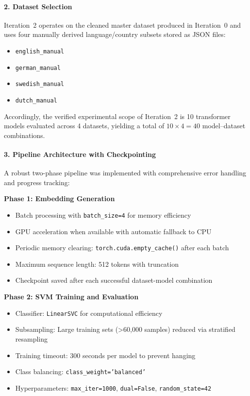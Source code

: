 \documentclass[11pt, titlepage, bibliography=totoc]{scrreprt}
\begin{document}
\paragraph{2. Dataset Selection}
Iteration~2 operates on the cleaned master dataset produced in Iteration~0 and uses four manually derived language/country subsets stored as JSON files:

\begin{itemize}
    \item \texttt{english\_manual}
    \item \texttt{german\_manual}
    \item \texttt{swedish\_manual}
    \item \texttt{dutch\_manual}
\end{itemize}

Accordingly, the verified experimental scope of Iteration~2 is 10 transformer models evaluated across 4 datasets, yielding a total of $10 \times 4 = 40$ model--dataset combinations.

\paragraph{3. Pipeline Architecture with Checkpointing}
A robust two-phase pipeline was implemented with comprehensive error handling and progress tracking:

\textbf{Phase 1: Embedding Generation}
\begin{itemize}
    \item Batch processing with \texttt{batch\_size=4} for memory efficiency
    \item GPU acceleration when available with automatic fallback to CPU
    \item Periodic memory clearing: \texttt{torch.cuda.empty\_cache()} after each batch
    \item Maximum sequence length: 512 tokens with truncation
    \item Checkpoint saved after each successful dataset-model combination
\end{itemize}

\textbf{Phase 2: SVM Training and Evaluation}
\begin{itemize}
    \item Classifier: \texttt{LinearSVC} for computational efficiency
    \item Subsampling: Large training sets (>60,000 samples) reduced via stratified resampling
    \item Training timeout: 300 seconds per model to prevent hanging
    \item Class balancing: \texttt{class\_weight='balanced'}
    \item Hyperparameters: \texttt{max\_iter=1000}, \texttt{dual=False}, \texttt{random\_state=42}
\end{itemize}
\end{document}

